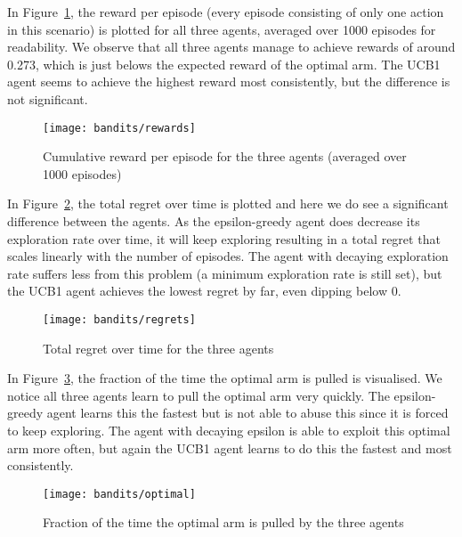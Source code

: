 \documentclass[10pt]{article}
\begin{document}
    In Figure~\ref{fig:reward}, the reward per episode (every episode consisting of only one action in this scenario) is plotted for all three agents, averaged over 1000 episodes
    for readability.
    We observe that all three agents manage to achieve rewards of around 0.273, which is just belows the expected
    reward of the optimal arm.
    The UCB1 agent seems to achieve the highest reward most consistently, but the difference is not significant.

    \begin{figure}
        \centering
        \texttt{[image: bandits/rewards]}
        \caption{Cumulative reward per episode for the three agents (averaged over 1000 episodes)}
        \label{fig:reward}
    \end{figure}

    In Figure~\ref{fig:regret}, the total regret over time is plotted and here we do see a significant difference between the agents.
    As the epsilon-greedy agent does decrease its exploration rate over time, it will keep exploring resulting
    in a total regret that scales linearly with the number of episodes.
    The agent with decaying exploration rate suffers less from this problem (a minimum exploration rate is still set),
    but the UCB1 agent achieves the lowest regret by far, even dipping below 0.

    \begin{figure}
        \centering
        \texttt{[image: bandits/regrets]}
        \caption{Total regret over time for the three agents}
        \label{fig:regret}
    \end{figure}

    In Figure~\ref{fig:optimal}, the fraction of the time the optimal arm is pulled is visualised.
    We notice all three agents learn to pull the optimal arm very quickly.
    The epsilon-greedy agent learns this the fastest but is not able to abuse this since it is forced
    to keep exploring.
    The agent with decaying epsilon is able to exploit this optimal arm more often, but again the UCB1 agent
    learns to do this the fastest and most consistently.

    \begin{figure}
        \centering
        \texttt{[image: bandits/optimal]}
        \caption{Fraction of the time the optimal arm is pulled by the three agents}
        \label{fig:optimal}
    \end{figure}
\end{document}
